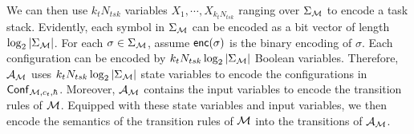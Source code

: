We can then use $k_t N_{tsk}$ variables $X_1, \cdots, X_{k_t N_{tsk}}$ ranging over $\Sigma_{\mathcal{M} }$  to encode a task stack. 
Evidently, each symbol in $\Sigma_{{\mathcal{M} }}$ can be encoded as a bit vector of length $\log_2 |\Sigma_{\mathcal{M} }|$. For each $\sigma \in \Sigma_{\mathcal{M} }$, assume ${\sf enc}(\sigma)$ is the binary encoding of $\sigma$. 
Each configuration can be encoded by 
$
k_t N_{tsk} \log_2 |\Sigma_{\mathcal{M} }|
$
Boolean variables. 
%
Therefore, ${\mathcal{A} }_{\mathcal{M} }$ uses $
k_t N_{tsk}  \log_2 |\Sigma_{\mathcal{M} }| 
$ state variables to encode the configurations in ${\mathsf{Conf} }_{{\mathcal{M} },c_t, \hbar}$. 
Moreover, ${\mathcal{A} }_{\mathcal{M} }$ contains the input variables to encode the transition rules of ${\mathcal{M} }$.
Equipped with these state variables and input variables, we then encode the semantics of the transition rules of ${\mathcal{M} }$ into the transitions of ${\mathcal{A} }_{\mathcal{M} }$. 
% 



